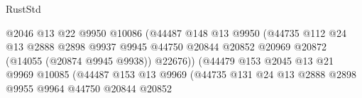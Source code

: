 \begin{lexlean}{RustStd}
\begin{coremodule}
                                                @2046
                                                @13
                                                @22
                                                @9950
                                                @10086
                                                (@44487
                                                  @148
                                                  @13
                                                  @9950
                                                  (@44735
                                                    @112
                                                    @24
                                                    @13
                                                    @2888
                                                    @2898
                                                    @9937
                                                    @9945
                                                    @44750
                                                    @20844
                                                    @20852
                                                    @20969
                                                    @20872
                                                    (@14055 (@20874 @9945 @9938))
                                                    @22676))
                                                (@44479
                                                  @153
                                                  @2045
                                                  @13
                                                  @21
                                                  @9969
                                                  @10085
                                                  (@44487
                                                    @153
                                                    @13
                                                    @9969
                                                    (@44735
                                                      @131
                                                      @24
                                                      @13
                                                      @2888
                                                      @2898
                                                      @9955
                                                      @9964
                                                      @44750
                                                      @20844
                                                      @20852

\end{coremodule}
\end{lexlean}
